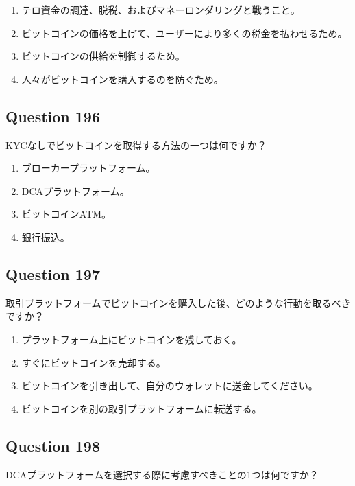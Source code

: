 \documentclass[12pt,a4paper]{article}
\begin{document}
\begin{enumerate}[label=\Alph*., leftmargin=*]
\item テロ資金の調達、脱税、およびマネーロンダリングと戦うこと。
\item ビットコインの価格を上げて、ユーザーにより多くの税金を払わせるため。
\item ビットコインの供給を制御するため。
\item 人々がビットコインを購入するのを防ぐため。
\end{enumerate}

\bigskip


\subsection*{Question 196}
KYCなしでビットコインを取得する方法の一つは何ですか？

\begin{enumerate}[label=\Alph*., leftmargin=*]
\item ブローカープラットフォーム。
\item DCAプラットフォーム。
\item ビットコインATM。
\item 銀行振込。
\end{enumerate}

\bigskip


\subsection*{Question 197}
取引プラットフォームでビットコインを購入した後、どのような行動を取るべきですか？

\begin{enumerate}[label=\Alph*., leftmargin=*]
\item プラットフォーム上にビットコインを残しておく。
\item すぐにビットコインを売却する。
\item ビットコインを引き出して、自分のウォレットに送金してください。
\item ビットコインを別の取引プラットフォームに転送する。
\end{enumerate}

\bigskip


\subsection*{Question 198}
DCAプラットフォームを選択する際に考慮すべきことの1つは何ですか？
\end{document}
